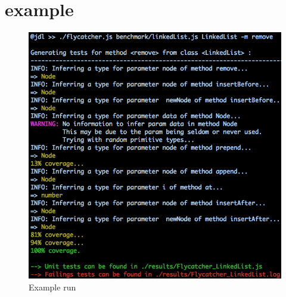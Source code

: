 \section{\textsf{} example}

\begin{figure}[t]
\centering
\includegraphics[scale=0.5]{./components/chapter3/lesscolour.png}
\caption{Example run}
\label{run}
\end{figure}

